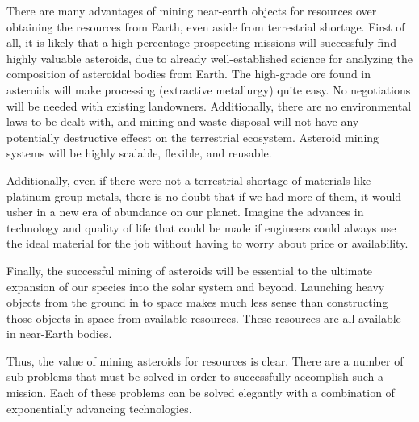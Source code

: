 \documentclass[english]{article}
\begin{document}
There are many advantages of mining near-earth objects for resources
over obtaining the resources from Earth, even aside from terrestrial
shortage. First of all, it is likely that a high percentage prospecting
missions will successfuly find highly valuable asteroids, due to already
well-established science for analyzing the composition of asteroidal
bodies from Earth. The high-grade ore found in asteroids will make
processing (extractive metallurgy) quite easy. No negotiations will
be needed with existing landowners. Additionally, there are no environmental
laws to be dealt with, and mining and waste disposal will not have
any potentially destructive effecst on the terrestrial ecosystem.
Asteroid mining systems will be highly scalable, flexible, and reusable\cite{sonter}.

Additionally, even if there were not a terrestrial shortage of materials
like platinum group metals, there is no doubt that if we had more
of them, it would usher in a new era of abundance on our planet. Imagine
the advances in technology and quality of life that could be made
if engineers could always use the ideal material for the job without
having to worry about price or availability.

Finally, the successful mining of asteroids will be essential to the
ultimate expansion of our species into the solar system and beyond.
Launching heavy objects from the ground in to space makes much less
sense than constructing those objects in space from available resources.
These resources are all available in near-Earth bodies.

Thus, the value of mining asteroids for resources is clear. There
are a number of sub-problems that must be solved in order to successfully
accomplish such a mission\cite{gerlach}. Each of these problems can
be solved elegantly with a combination of exponentially advancing
technologies.
\end{document}

